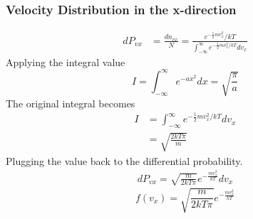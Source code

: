 \documentclass[letterpaper]{article}
\begin{document}
\subsubsection*{Velocity Distribution in the x-direction}
\begin{equation*}
    \begin{aligned}
        dP_{vx} & = \frac{dn_{vx}}{N} = \frac{e^{-\frac{1}{2}mv_x^2}/kT}{\int_{-\infty}^{\infty}
            e^{-\frac{1}{2}mv_x^2/kT}dv_x}
    \end{aligned}
\end{equation*}
Applying the integral value
\begin{equation*}
    I = \int_{-\infty}^{\infty}e^{-ax^2}dx=\sqrt{\frac{\pi}{a}}
\end{equation*}
The original integral becomes
\begin{equation*}
    \begin{aligned}
        I & = \int_{-\infty}^{\infty}e^{-\frac{1}{2}mv_x^2/kT}dv_x \\
          & = \sqrt{\frac{2kT\pi}{m}}
    \end{aligned}
\end{equation*}
Plugging the value back to the differential probability.
\begin{equation*}
    \begin{aligned}
        dP_{vx}=\sqrt{\frac{m}{2kT\pi}}e^{-\frac{mv_x^2}{kT}}dv_x
    \end{aligned}
\end{equation*}
\begin{equation*}
    f(v_x)=\sqrt{\frac{m}{2kT\pi}}e^{-\frac{mv_x^2}{kT}}
\end{equation*}
\end{document}
